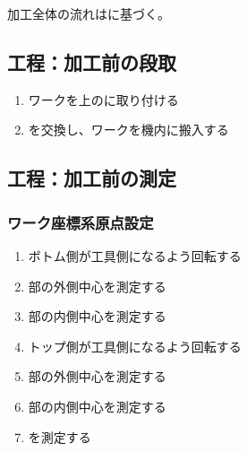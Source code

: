 




加工全体の流れはに基づく。


\subsection{工程：加工前の段取}
\begin{enumerate}[label*=\sarrow]
\item ワークを\Table 上の\Jig に取り付ける
\item \Palette を交換し、ワークを機内に搬入する
\end{enumerate}


\subsection{工程：加工前の測定}

\subsubsection{ワーク座標系原点設定}
\begin{enumerate}[label*=\sarrow]
\item ボトム側が工具側になるよう回転する
\item \BottomEndFace 部の外側中心を測定する
\item \BottomEndFace 部の内側中心を測定する
\item トップ側が工具側になるよう回転する
\item \TopEndFace 部の外側中心を測定する
\item \TopEndFace 部の内側中心を測定する
\item \KeywayCenter を測定する
\end{enumerate}

